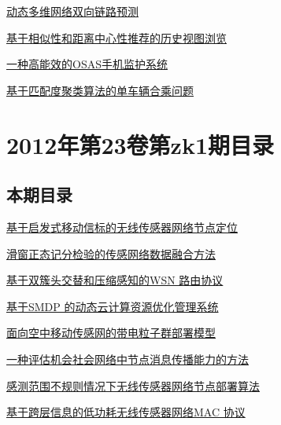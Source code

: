 \documentclass[a4paper]{article}
\begin{document}
\href{http://www.jos.org.cn/ch/reader/download_pdf.aspx?file_no=12037&year_id=2012&quarter_id=zk2&falg=1}{动态多维网络双向链路预测}

\href{http://www.jos.org.cn/ch/reader/download_pdf.aspx?file_no=12038&year_id=2012&quarter_id=zk2&falg=1}{基于相似性和距离中心性推荐的历史视图浏览}

\href{http://www.jos.org.cn/ch/reader/download_pdf.aspx?file_no=12039&year_id=2012&quarter_id=zk2&falg=1}{一种高能效的OSAS手机监护系统}

\href{http://www.jos.org.cn/ch/reader/download_pdf.aspx?file_no=12040&year_id=2012&quarter_id=zk2&falg=1}{基于匹配度聚类算法的单车辆合乘问题}


\section{\textbf{2012年第23卷第zk1期目录}}
\subsection{本期目录}
\href{http://www.jos.org.cn/ch/reader/download_pdf.aspx?file_no=12001&year_id=2012&quarter_id=zk1&falg=1}{基于启发式移动信标的无线传感器网络节点定位}

\href{http://www.jos.org.cn/ch/reader/download_pdf.aspx?file_no=12002&year_id=2012&quarter_id=zk1&falg=1}{滑窗正态记分检验的传感网络数据融合方法}

\href{http://www.jos.org.cn/ch/reader/download_pdf.aspx?file_no=12003&year_id=2012&quarter_id=zk1&falg=1}{基于双簇头交替和压缩感知的WSN 路由协议}

\href{http://www.jos.org.cn/ch/reader/download_pdf.aspx?file_no=12004&year_id=2012&quarter_id=zk1&falg=1}{基于SMDP 的动态云计算资源优化管理系统}

\href{http://www.jos.org.cn/ch/reader/download_pdf.aspx?file_no=12005&year_id=2012&quarter_id=zk1&falg=1}{面向空中移动传感网的带电粒子群部署模型}

\href{http://www.jos.org.cn/ch/reader/download_pdf.aspx?file_no=12006&year_id=2012&quarter_id=zk1&falg=1}{一种评估机会社会网络中节点消息传播能力的方法}

\href{http://www.jos.org.cn/ch/reader/download_pdf.aspx?file_no=12007&year_id=2012&quarter_id=zk1&falg=1}{感测范围不规则情况下无线传感器网络节点部署算法}

\href{http://www.jos.org.cn/ch/reader/download_pdf.aspx?file_no=12008&year_id=2012&quarter_id=zk1&falg=1}{基于跨层信息的低功耗无线传感器网络MAC 协议}
\end{document}
